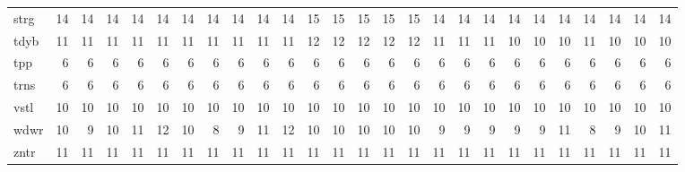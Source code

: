 \begin{center}
\begin{tabular}{lrrrrrrrrrrrrrrrrrrrrrrrrr}
strg & 14 & 14 & 14 & 14 & 14 & 14 & 14 & 14 & 14 & 14 & 15 & 15 & 15 & 15 & 15 & 14 & 14 & 14 & 14 & 14 & 14 & 14 & 14 & 14 & 14\\
tdyb & 11 & 11 & 11 & 11 & 11 & 11 & 11 & 11 & 11 & 11 & 12 & 12 & 12 & 12 & 12 & 11 & 11 & 11 & 10 & 10 & 10 & 11 & 10 & 10 & 10\\
tpp & 6 & 6 & 6 & 6 & 6 & 6 & 6 & 6 & 6 & 6 & 6 & 6 & 6 & 6 & 6 & 6 & 6 & 6 & 6 & 6 & 6 & 6 & 6 & 6 & 6\\
trns & 6 & 6 & 6 & 6 & 6 & 6 & 6 & 6 & 6 & 6 & 6 & 6 & 6 & 6 & 6 & 6 & 6 & 6 & 6 & 6 & 6 & 6 & 6 & 6 & 6\\
vstl & 10 & 10 & 10 & 10 & 10 & 10 & 10 & 10 & 10 & 10 & 10 & 10 & 10 & 10 & 10 & 10 & 10 & 10 & 10 & 10 & 10 & 10 & 10 & 10 & 10\\
wdwr & 10 & 9 & 10 & 11 & 12 & 10 & 8 & 9 & 11 & 12 & 10 & 10 & 10 & 10 & 10 & 9 & 9 & 9 & 9 & 9 & 11 & 8 & 9 & 10 & 11\\
zntr & 11 & 11 & 11 & 11 & 11 & 11 & 11 & 11 & 11 & 11 & 11 & 11 & 11 & 11 & 11 & 11 & 11 & 11 & 11 & 11 & 11 & 11 & 11 & 11 & 11\\
\end{tabular}
\end{center}
